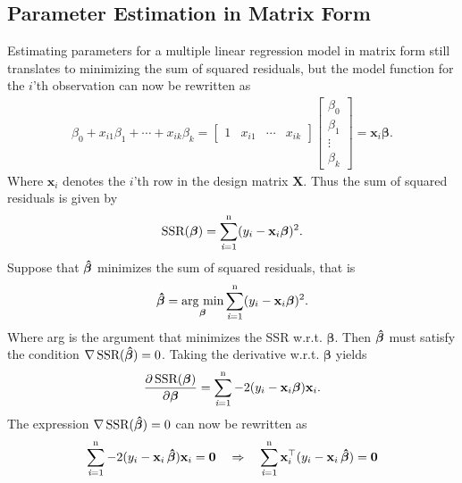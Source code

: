 \subsection{Parameter Estimation in Matrix Form}
Estimating parameters for a multiple linear regression model in matrix form still translates to minimizing the sum of squared residuals, but the model function for the $i$'th observation can now be rewritten as
\begin{align*}
    \beta_0 + x_{i1} \beta_1 + \cdots + x_{ik}\beta_k =
    \begin{bmatrix} 
    1 & x_{i1} & \cdots & x_{ik}  
    \end{bmatrix} 
    \begin{bmatrix}
    \beta_0 \\ \beta_1 \\ \vdots \\ \beta_k
    \end{bmatrix} = \mathbf{x}_i \boldsymbol{\beta}.
\end{align*}
Where $\mathbf{x}_i$ denotes the $i$'th row in the design matrix $\mathbf{X}$.
Thus the sum of squared residuals is given by
\begin{align*}
    \operatorname{\text{SSR}}(\boldsymbol{\beta}) = \operatorname{\sum_{\textit{i}=1}^n} (y_i - \mathbf{x}_i\boldsymbol{\beta})^2.
\end{align*}
Suppose that $\operatorname{\boldsymbol{\hat{\beta}}}$ minimizes the sum of squared residuals, that is
\begin{align*}
    \operatorname{\boldsymbol{\hat{\beta}}} = \underset{\boldsymbol{\beta}}{\operatorname{\text{arg min}}} \operatorname{\sum_{\textit{i}=1}^n} (y_i - \mathbf{x}_i\boldsymbol{\beta})^2.
\end{align*}
Where arg is the argument that minimizes the SSR w.r.t.$\!$ $\boldsymbol{\beta}$. Then $\operatorname{\boldsymbol{\hat{\beta}}}$ must satisfy the condition $\nabla \operatorname{\text{SSR}}(\operatorname{\boldsymbol{\hat{\beta}}}) = 0$.
Taking the derivative w.r.t. $\boldsymbol{\beta}$ yields
\begin{align}\label{eq:ssr_derivative}
    \frac{\partial \operatorname{\text{SSR}}(\boldsymbol{\beta})}{\partial \boldsymbol{\beta}} 
    =  \operatorname{\sum_{\textit{i}=1}^n} -2(y_i - \mathbf{x}_i \boldsymbol{\beta})\mathbf{x}_i.
\end{align}
The expression $\nabla \operatorname{\text{SSR}} (\operatorname{\boldsymbol{\hat{\beta}}}) = 0$ can now be rewritten as
\begin{align*}
    \operatorname{\sum_{\textit{i}=1}^n} -2(y_i - \mathbf{x}_i \operatorname{\boldsymbol{\hat{\beta}}})\mathbf{x}_i = \mathbf{0} 
    \quad \Rightarrow \quad
    \operatorname{\sum_{\textit{i}=1}^n} \mathbf{x}_i^\top(y_i - \mathbf{x}_i \operatorname{\boldsymbol{\hat{\beta}}}) = \mathbf{0}
\end{align*}
